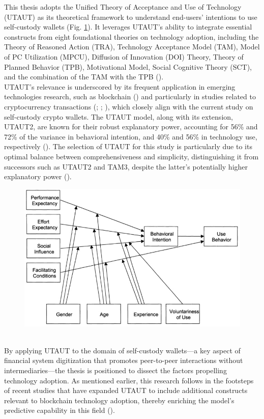 \documentclass[twocolumn]{article}
\begin{document}
This thesis adopts the Unified Theory of Acceptance and Use of Technology (UTAUT) as its theoretical framework to understand end-users' intentions to use self-custody wallets (Fig. \ref{fig:UTAUT}). It leverages UTAUT's ability to integrate essential constructs from eight foundational theories on technology adoption, including the Theory of Reasoned Action (TRA), Technology Acceptance Model (TAM), Model of PC Utilization (MPCU), Diffusion of Innovation (DOI) Theory, Theory of Planned Behavior (TPB), Motivational Model, Social Cognitive Theory (SCT), and the combination of the TAM with the TPB (\cite{queiroz_blockchain_2019}).
\\UTAUT's relevance is underscored by its frequent application in emerging technologies research, such as blockchain (\cite{lampo_how_2022}) and particularly in studies related to cryptocurrency transactions (\cite{alomari_factors_2023}; \cite{radic_you_2022}; \cite{siddiqui_conceptual_2022}), which closely align with the current study on self-custody crypto wallets. The UTAUT model, along with its extension, UTAUT2, are known for their robust explanatory power, accounting for 56\% and 72\% of the variance in behavioral intention, and 40\% and 56\% in technology use, respectively (\cite{venkatesh_consumer_2012}). The selection of UTAUT for this study is particularly due to its optimal balance between comprehensiveness and simplicity, distinguishing it from successors such as UTAUT2 and TAM3, despite the latter's potentially higher explanatory power (\cite{lampo_how_2022}).
\begin{figure}[tp]
    \centering
    \includegraphics[width=0.7\linewidth]{UTAUT.jpg}
    \label{fig:UTAUT}
        
\end{figure}
\\By applying UTAUT to the domain of self-custody wallets—a key aspect of financial system digitization that promotes peer-to-peer interactions without intermediaries—the thesis is positioned to dissect the factors propelling technology adoption. As mentioned earlier, this research follows in the footsteps of recent studies that have expanded UTAUT to include additional constructs relevant to blockchain technology adoption, thereby enriching the model's predictive capability in this field (\cite{alazab_blockchain_2021, arias-oliva_fuzzy_2021, ferri_ascertaining_2021, khazaei_integrating_2020, liang_what_2021, queiroz_blockchain_2021, queiroz_blockchain_2019, tran_co-creating_2021, wong_unearthing_2020}).
\end{document}
